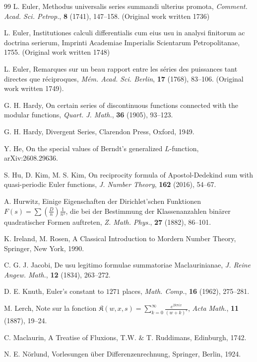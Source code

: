 \documentclass[reqno]{amsart}
\numberwithin{equation}{section}
\begin{document}
\begin{thebibliography}{99}
 L. Euler, Methodus universalis series summandi ulterius promota, \emph{Comment. Acad. Sci. Petrop.}, \textbf{8} (1741), 147--158. (Original work written 1736)

 L. Euler, Institutiones calculi differentialis cum eius usu in analysi finitorum ac doctrina serierum, Imprinti Academiae Imperialis Scientarum Petropolitanae, 1755. (Original work written 1748)

 L. Euler, Remarques sur un beau rapport entre les s\'{e}ries des puissances tant directes que r\'{e}ciproques, \emph{M\'{e}m. Acad. Sci. Berlin}, \textbf{17} (1768), 83--106. (Original work written 1749).

 G. H. Hardy, On certain series of discontinuous functions connected with the modular functions, \emph{Quart. J. Math.}, \textbf{36} (1905), 93--123.

 G. H. Hardy, Divergent Series, Clarendon Press, Oxford, 1949.

 Y. He, On the special values of Berndt's generalized $L$-function, arXiv:2608.29636.

 S. Hu, D. Kim, M. S. Kim, On reciprocity formula of Apostol-Dedekind sum
with quasi-periodic Euler functions, \emph{J. Number Theory}, \textbf{162} (2016), 54--67.

  A. Hurwitz, Einige Eigenschaften der Dirichlet'schen Funktionen $F(s)=\sum(\frac{D}{n})\frac{1}{n^{s}}$, die bei der Bestimmung der Klassenanzahlen bin\"{a}rer quadratischer Formen auftreten, \emph{Z. Math. Phys.}, \textbf{27} (1882), 86--101.

 K. Ireland, M. Rosen, A Classical Introduction to Mordern Number Theory, Springer, New York, 1990.

 C. G. J. Jacobi, De usu legitimo formulae summatoriae Maclaurinianae, \emph{J. Reine Angew. Math.}, \textbf{12} (1834), 263--272.

 D. E. Knuth, Euler's constant to $1271$ places, \emph{Math. Comp.}, \textbf{16} (1962), 275--281.

 M. Lerch, Note sur la fonction $\mathfrak{K}(w,x,s)=\sum_{k=0}^{\infty} \frac{e^{2k\pi i x}}{(w+k)^s}$, \emph{Acta Math.}, \textbf{11} (1887), 19--24.

 C. Maclaurin, A Treatise of Fluxions, T.W. $\&$ T. Ruddimans, Edinburgh, 1742.

 N. E. N\"{o}rlund, Vorlesungen \"{u}ber Differenzenrechnung, Springer, Berlin, 1924.


\end{thebibliography}
\end{document}
